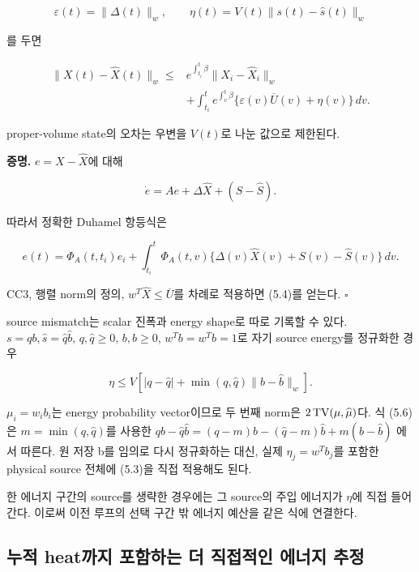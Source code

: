 \[
\varepsilon(t)=\|\Delta(t)\|_w,\qquad
\eta(t)=V(t)\|s(t)-\widehat s(t)\|_w
\tag{5.3}
\]

를 두면

\[
\boxed{
\begin{aligned}
\|X(t)-\widehat X(t)\|_w
\le {}&
e^{\int_{t_i}^{t}\beta}\|X_i-\widehat X_i\|_w\\
&+\int_{t_i}^{t}
e^{\int_v^t\beta}
\{\varepsilon(v)\overline U(v)+\eta(v)\}\,dv.
\end{aligned}
}
\tag{5.4}
\]

proper-volume state의 오차는 우변을 \(V(t)\)로 나눈 값으로 제한된다.

\textbf{증명.} \(e=X-\widehat X\)에 대해

\[
\dot e=Ae+\Delta\widehat X+(S-\widehat S).
\]

따라서 정확한 Duhamel 항등식은

\[
e(t)=\Phi_A(t,t_i)e_i+
\int_{t_i}^{t}\Phi_A(t,v)
\{\Delta(v)\widehat X(v)+S(v)-\widehat S(v)\}\,dv.
\tag{5.5}
\]

CC3, 행렬 norm의 정의, \(w^T\widehat X\le\overline U\)를 차례로 적용하면 (5.4)를 얻는다. \(\square\)

source mismatch는 scalar 진폭과 energy shape로 따로 기록할 수 있다. \(s=qb,\widehat s=\widehat q\widehat b\), \(q,\widehat q\ge0\), \(b,\widehat b\ge0\), \(w^Tb=w^T\widehat b=1\)로 자기 source energy를 정규화한 경우

\[
\boxed{
\eta\le V\left[
|q-\widehat q|
+\min(q,\widehat q)\|b-\widehat b\|_w
\right].
}
\tag{5.6}
\]

\(\mu_i=w_ib_i\)는 energy probability vector이므로 두 번째 norm은 \(2\,{\rm TV}(\mu,\widehat\mu)\)다. 식 (5.6)은 \(m=\min(q,\widehat q)\)를 사용한 \(qb-\widehat q\widehat b=(q-m)b-(\widehat q-m)\widehat b+m(b-\widehat b)\) 에서 따른다. 원 저장 b를 임의로 다시 정규화하는 대신, 실제 \(\eta_j=w^Tb_j\)를 포함한 physical source 전체에 (5.3)을 직접 적용해도 된다.

한 에너지 구간의 source를 생략한 경우에는 그 source의 주입 에너지가 \(\eta\)에 직접 들어간다. 이로써 이전 루프의 선택 구간 밖 에너지 예산을 같은 식에 연결한다.

\hypertarget{uxb204uxc801-heatuxae4cuxc9c0-uxd3ecuxd568uxd558uxb294-uxb354-uxc9c1uxc811uxc801uxc778-uxc5d0uxb108uxc9c0-uxcd94uxc815}{%
\subsection{누적 heat까지 포함하는 더 직접적인 에너지 추정}\label{uxb204uxc801-heatuxae4cuxc9c0-uxd3ecuxd568uxd558uxb294-uxb354-uxc9c1uxc811uxc801uxc778-uxc5d0uxb108uxc9c0-uxcd94uxc815}}

